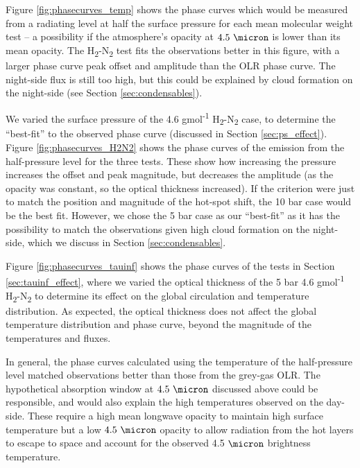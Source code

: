 Figure \ref{fig:phasecurves_temp} shows the phase curves which would be measured from a radiating level at half the surface pressure for each mean molecular weight test -- a possibility if the atmosphere's opacity at $4.5\ \micron$ is lower than its mean opacity. The H\textsubscript{2}-N\textsubscript{2} test fits the observations better in this figure, with a larger phase curve peak offset and amplitude than the OLR phase curve. The night-side flux is still too high, but this could be explained by cloud formation on the night-side (see Section \ref{sec:condensables}).

We varied the surface pressure of the 4.6 gmol\textsuperscript{-1} H\textsubscript{2}-N\textsubscript{2} case, to determine the ``best-fit'' to the observed phase curve (discussed in Section \ref{sec:ps_effect}). Figure \ref{fig:phasecurves_H2N2} shows the phase curves of the emission from the half-pressure level for the three tests. These show how increasing the pressure increases the offset and peak magnitude, but decreases the amplitude (as the opacity was constant, so the optical thickness increased). If the criterion were just to match the position and magnitude of the hot-spot shift, the 10 bar case would be the best fit. However, we chose the 5 bar case as our ``best-fit'' as it has the possibility to match the observations given high cloud formation on the night-side, which we discuss in Section \ref{sec:condensables}.



Figure \ref{fig:phasecurves_tauinf} shows the phase curves of the tests in Section \ref{sec:tauinf_effect}, where we varied the optical thickness of the 5 bar 4.6 gmol\textsuperscript{-1} H\textsubscript{2}-N\textsubscript{2} to determine its effect on the global circulation and temperature distribution. As expected, the optical thickness does not affect the global temperature distribution and phase curve, beyond the magnitude of the temperatures and fluxes.


In general, the phase curves calculated using the temperature of the half-pressure level matched observations better than those from the grey-gas OLR. The hypothetical absorption window at $4.5\ \micron$ discussed above could be responsible, and would also explain the high temperatures observed on the day-side. These require a high mean longwave opacity to maintain high surface temperature but a low $4.5\ \micron$ opacity to allow radiation from the hot layers to escape to space and account for the observed 4.5 $\micron$ brightness temperature.


